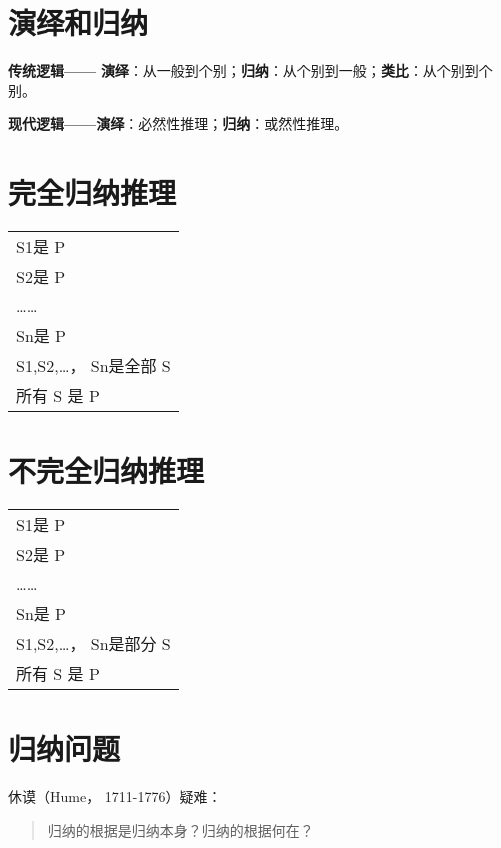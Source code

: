 \documentclass[12pt,onecolumn,a4paper]{book}
\numberwithin{table}{subsection}
\numberwithin{equation}{subsection}
\begin{document}
\section{演绎和归纳}


\textbf{传统逻辑——}
\textbf{演绎}：从一般到个别；\textbf{归纳}：从个别到一般；\textbf{类比}：从个别到个别。

\textbf{现代逻辑——演绎}：必然性推理；\textbf{归纳}：或然性推理。

\section{完全归纳推理}

\begin{tabular}{l}
S1是 P\\
S2是 P\\
……\\
Sn是 P\\
S1,S2,…， Sn是全部 S\\
\hline
所有 S 是 P  \\
\end{tabular}

\section{不完全归纳推理}
\begin{tabular}{l}
    S1是 P\\
    S2是 P\\
    ……\\
    Sn是 P\\
    S1,S2,…， Sn是部分 S\\
    \hline
    所有 S 是 P  \\
\end{tabular}

\section{归纳问题}
休谟（Hume， 1711-1776）疑难：
\begin{quotation}
    归纳的根据是归纳本身？归纳的根据何在？
\end{quotation}
\end{document}

